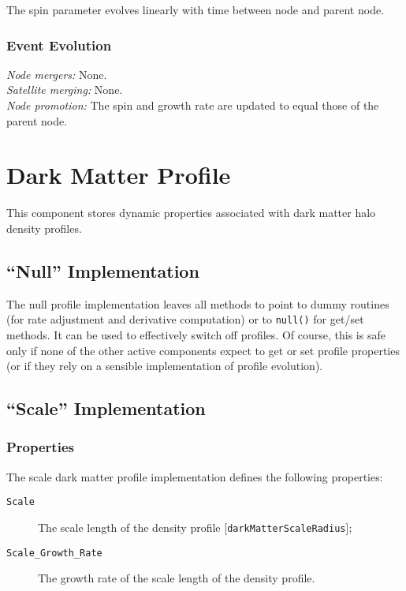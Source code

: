 The spin parameter evolves linearly with time between node and parent node.

\subsubsection{Event Evolution}

\noindent\emph{Node mergers:} None.\\

\noindent\emph{Satellite merging:} None.\\

\noindent\emph{Node promotion:} The spin and growth rate are updated to equal those of the parent node.\\

\section{Dark Matter Profile}\label{sec:DarkMatterProfileComponent}

This component stores dynamic properties associated with dark matter halo density profiles.

\subsection{``Null'' Implementation}

The null profile implementation leaves all methods to point to dummy routines (for rate adjustment and derivative computation) or to {\tt null()} for get/set methods. It can be used to effectively switch off profiles. Of course, this is safe only if none of the other active components expect to get or set profile properties (or if they rely on a sensible implementation of profile evolution).

\subsection{``Scale'' Implementation}

\subsubsection{Properties}

The scale dark matter profile implementation defines the following properties:
\begin{description}
 \item [{\tt Scale}] The scale length of the density profile [{\tt darkMatterScaleRadius}];
 \item [{\tt Scale\_Growth\_Rate}] The growth rate of the scale length of the density profile.
\end{description}

